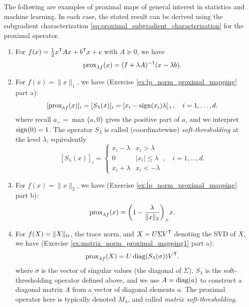 \begin{Example}
\label{xa:proximal_mappings}
The following are examples of proximal maps of general interest in statistics
and machine learning. In each case, the stated result can be derived using the 
subgradient characterization \eqref{eq:proximal_subgradient_characterization} 
for the proximal operator.

\begin{enumerate}[label=\alph*., ref=\alph*]
\item For $f(x) = \frac{1}{2} x^{\mathsf{T}} A x + b^{\mathsf{T}} x + c$ with $A \succeq 0$, we have 
  \[
  \operatorname{prox}_{\lambda f}(x) = (I + \lambda A)^{-1} (x - \lambda b).
  \]

\item {} 
  For $f(x) = \|x\|_1$, we have (Exercise \ref{ex:lp_norm_proximal_mapping} part 
  a): 
  \[
  [\operatorname{prox}_{\lambda f}(x)]_i = [S_\lambda(x)]_i = [x_i - \operatorname{sign}(x_i) \lambda]_+,
  \quad i = 1,\ldots,d.
  \]
  where recall $a_+ = \max\{a, 0\}$ gives the positive part of $a$, and we
  interpret $\operatorname{sign}(0) = 1$. The operator $S_\lambda$ is called (coordinatewise)
  \emph{soft-thresholding} at the level $\lambda$, equivalently   
  \begin{equation}
  \label{eq:soft_thresholding}
  [S_\lambda(x)]_i = 
  \begin{cases}
  x_i - \lambda & x_i > \lambda \\
  0 & |x_i| \leq \lambda \\
  x_i + \lambda & x_i < -\lambda
  \end{cases}, 
  \quad i = 1,\ldots,d.
  \end{equation}

\item {}  
  For $f(x) = \|x\|_2$, we have (Exercise \ref{ex:lp_norm_proximal_mapping} part
  b): 
  \[
  \operatorname{prox}_{\lambda f}(x) = \bigg(1 - \frac{\lambda}{\|x\|_2} \bigg)_+ x.
  \]

\item {} 
  For $f(X) = \|X\|_{\operatorname{tr}}$, the trace norm, and $X = U \Sigma V^{\mathsf{T}}$ denoting the
  SVD of $X$, we have (Exercise \ref{ex:matrix_norm_proximal_mapping1} part a):      
  \[
  \operatorname{prox}_{\lambda f}(X) = U \operatorname{diag}(S_\lambda(\sigma)) V^{\mathsf{T}}.
  \]
  where $\sigma$ is the vector of singular values (the diagonal of $\Sigma$),
  $S_\lambda$ is the soft-thresholding operator defined above, and we use $A =
  \operatorname{diag}(a)$ to construct a diagonal matrix $A$ from a vector of diagonal
  elements $a$. The proximal operator here is typically denoted $M_\lambda$, and
  called \emph{matrix soft-thresholding}.


\end{enumerate}
\end{Example}
